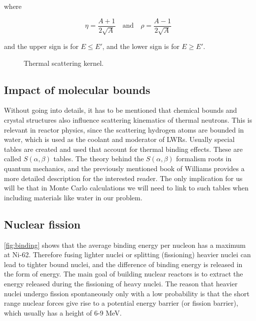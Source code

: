 \noindent where

\[
\eta=\frac{A+1}{2\sqrt{A}} \quad \text{and} \quad \rho=\frac{A-1}{2\sqrt{A}}
\]

\noindent and the upper sign is for $E\leq E'$, and the lower sign is for $E\geq E'$.

\begin{figure}[ht!]
\protect {}\protect
\caption{\label{fig:thermalkernel} \footnotesize{Thermal scattering kernel.}}
\end{figure}

\subsection{Impact of molecular bounds}

Without going into details, it has to be mentioned that chemical bounds and crystal structures also influence scattering kinematics of thermal neutrons. This is relevant in reactor physics, since the scattering hydrogen atoms are bounded in water, which is used as the coolant and moderator of LWRs. Usually special tables are created and used that account for thermal binding effects. These are called $S(\alpha,\beta)$ tables. The theory behind the $S(\alpha,\beta)$ formalism roots in quantum mechanics, and the previously mentioned book of Williams provides a more detailed description for the interested reader. The only implication for us will be that in Monte Carlo calculations we will need to link to such tables when including materials like water in our problem.


\subsection{Nuclear fission}

\autoref{fig:binding} shows that the average binding energy per nucleon has a maximum at Ni-62. Therefore fusing lighter nuclei or splitting (fissioning) heavier nuclei can lead to tighter bound nuclei, and the difference of binding energy is released in the form of energy. The main goal of building nuclear reactors is to extract the energy released during the fissioning of heavy nuclei. The reason that heavier nuclei undergo fission spontaneously only with a low probability is that the short range nuclear forces give rise to a potential energy barrier (or fission barrier), which usually has a height of 6-9 MeV. 

